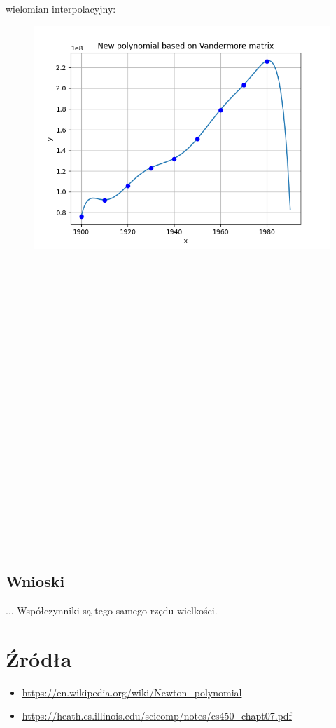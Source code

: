 \documentclass{article}
\begin{document}
wielomian interpolacyjny:
\begin{figure}[ht!]
  \includegraphics[width=\linewidth]{figures/new_vandermore.png}
\end{figure}
\\\\\\\\\\\\\\\\\\\\\\\\\\\\\\\\\\\\\\\\\\

\subsection*{Wnioski}
\null\quad ...
Współczynniki są tego samego rzędu wielkości.

\section*{Źródła}
\begin{itemize}
    \item \url{https://en.wikipedia.org/wiki/Newton_polynomial}
    \item \url{https://heath.cs.illinois.edu/scicomp/notes/cs450_chapt07.pdf}
\end{itemize}
\end{document}
